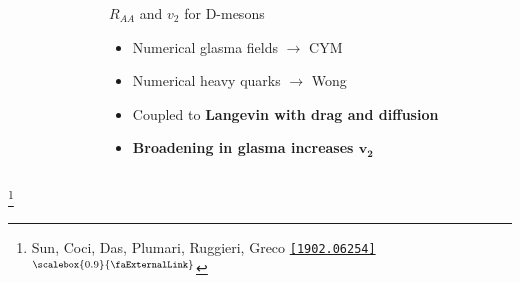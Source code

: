 \documentclass[aspectratio=169,11pt,usenames,dvipsnames]{beamer}
\renewcommand{\thefootnote}{\color{customblue}\faPaperPlaneO}
\newcommand\blfootnote[1]{%
  \begingroup
  \renewcommand\thefootnote{}\footnote{#1}%
  \addtocounter{footnote}{-1}%
  \endgroup
}
\begin{document}
\begin{frame}[t]
\begin{columns}[onlytextwidth,t]
\begin{figure}
        \end{figure}
        \begin{center}
            {\Large\color{isgold} $R_{AA}$ and $v_2$ for D-mesons \\[10pt]}
            \footnotesize
                \begin{itemize}
                    \item {\color{lightgray}Numerical glasma fields $\rightarrow$ CYM}
                    \item {\color{lightgray}Numerical heavy quarks $\rightarrow$ Wong}
                    \item {\color{lightgray}Coupled to {\bfseries Langevin with drag and diffusion}}\\[15pt]
                    \item {\color{destacado}\bfseries\normalsize{Broadening in glasma increases $\boldsymbol{v_2}$}}
                \end{itemize}
        \end{center}
    \end{columns}
    \blfootnote{\scriptsize Sun, Coci, Das, Plumari, Ruggieri, Greco \href{https://arxiv.org/abs/1902.06254}{\color{palgold}\texttt{[1902.06254]}$^\text{\scalebox{0.9}{\faExternalLink}}$}}
\end{frame}


\end{document}
